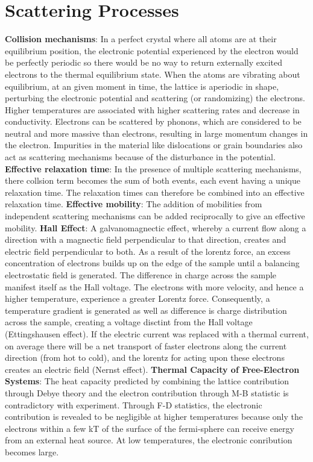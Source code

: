 \documentclass{article}
\numberwithin{equation}{section}
\begin{document}
\section*{Scattering Processes}
\textbf{Collision mechanisms}: In a perfect crystal where all atoms are at their equilibrium position, the electronic potential experienced by the electron would be perfectly periodic so there would be no way to return externally excited electrons to the thermal equilibrium state. When the atoms are vibrating about equilibrium, at an given moment in time, the lattice is aperiodic in shape, perturbing the electronic potential and scattering (or randomizing) the electrons. Higher temperatures are associated with higher scattering rates and decrease in conductivity. Electrons can be scattered by phonons, which are considered to be neutral and more massive than electrons, resulting in large momentum changes in the electron. Impurities in the material like dislocations or grain boundaries also act as scattering mechanisms because of the disturbance in the potential. 
\newline
\textbf{Effective relaxation time}: In the presence of multiple scattering mechanisms, there collsion term becomes the sum of both events, each event having a unique relaxation time. The relaxation times can therefore be combined into an effective relaxation time. 
\newline
\textbf{Effective mobility}: The addition of mobilities from independent scattering mechanisms can be added reciprocally to give an effective mobility.
\newline
\textbf{Hall Effect}: A galvanomagnectic effect, whereby a current flow along a direction with a magnectic field perpendicular to that direction, creates and electric field perpendicular to both. As a result of the lorentz force, an excess concentration of electrons builds up on the edge of the sample until a balancing electrostatic field is generated. The difference in charge across the sample manifest itself as the Hall voltage. The electrons with more velocity, and hence a higher temperature, experience a greater Lorentz force. Consequently, a temperature gradient is generated as well as difference is charge distribution across the sample, creating a voltage disctint from the Hall voltage (Ettingshausen effect). If the electric current was replaced with a thermal current, on average there will be a net transport of faster electrons along the current direction (from hot to cold), and the lorentz for acting upon these electrons creates an electric field (Nernst effect).    
\newline
\textbf{Thermal Capacity of Free-Electron Systems}: The heat capacity predicted by combining the lattice contribution through Debye theory and the electron contribution through M-B statistic is contradictory with experiment. Through F-D statistics, the electronic contribution is revealed to be negligible at higher temperatures because only the electrons within a few kT of the surface of the fermi-sphere can receive energy from an external heat source. At low temperatures, the electronic conribution becomes large.
\end{document}
